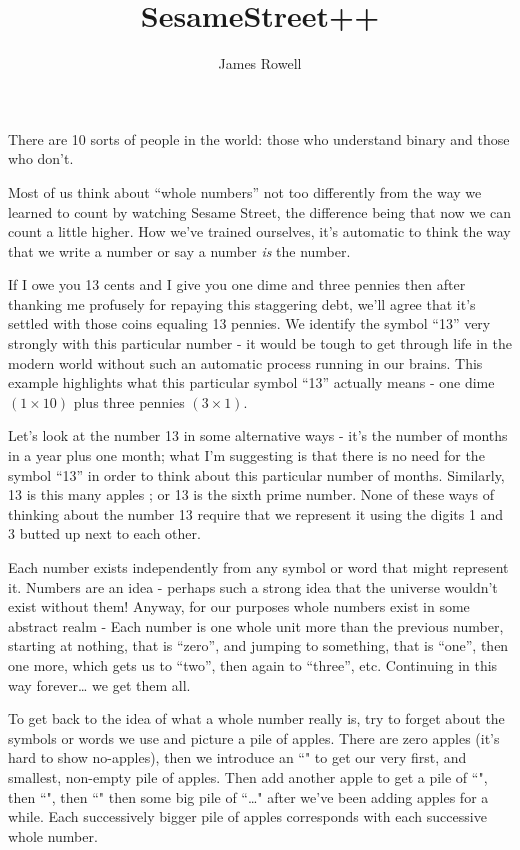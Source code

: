 \documentclass{article}
\title{SesameStreet++}
\author{James Rowell}
\begin{document}
\maketitle
\begin{em}
\small{}There are 10 sorts of people in the world: those who understand binary and those who don't.
\end{em}
\normalsize
\bigskip

Most of us think about ``whole numbers'' not too differently from the way
we learned to count by watching Sesame Street,
the difference being that now we can count a little higher.
How we've trained ourselves, it's automatic to think the way
that we write a number or say a number \emph{is} the number.

If I owe you 13 cents and I give you one dime and three pennies then 
after thanking me profusely for repaying this staggering debt,
we'll agree that it's settled with those coins equaling 13 pennies. 
We identify the symbol ``13'' very strongly with this particular number - it would 
be tough to get through life in the modern world without such an automatic process
running in our brains. 
This example highlights what this particular symbol ``13'' actually means -
one dime $(1 \times 10)$ plus three pennies $(3 \times 1)$.

Let's look at the number 13 in some alternative ways - it's the 
number of months in a year plus one month;
what I'm suggesting is that there is no need for the symbol ``13'' in order
to think about this particular number of months. Similarly, 13 is this many apples
\faApple{}\faApple{}\faApple{}\faApple{}\faApple{}\faApple{}\faApple{}\faApple{}\faApple{}\faApple{}\faApple{}\faApple{}\faApple{};
or 13 is the sixth prime number. None of these ways of thinking about the number
13 require that we represent it using the digits 1 and 3 butted up next to each other.

Each number exists independently from any symbol or word that might represent it.
Numbers are an idea - perhaps such a strong idea that the universe wouldn't exist without them!
Anyway, for our purposes whole numbers exist in some abstract realm -
Each number is one whole unit more than the previous number,
starting at nothing, that is ``zero'', and jumping to something, that is ``one'',
then one more, which gets us to ``two'',
then again to ``three'', etc. Continuing in this way forever\dots{} we get them all.

To get back to the idea of what a whole number really is,
try to forget about the symbols or words we use and picture a pile of apples.
There are zero apples (it's hard to show no-apples),
then we introduce an ``\faApple{}" to get our very first,
and smallest, non-empty pile of apples.
Then add another apple to get a pile of ``\faApple{}\faApple{}",
then ``\faApple{}\faApple{}\faApple{}",
then ``\faApple{}\faApple{}\faApple{}\faApple{}"
then some big pile of
``\faApple{}\faApple{}\faApple{}\faApple{}\faApple{}\dots{}\faApple{}\faApple{}\faApple{}"
after we've been adding apples for a while.
Each successively bigger pile of apples corresponds with each successive whole number.
\end{document}
